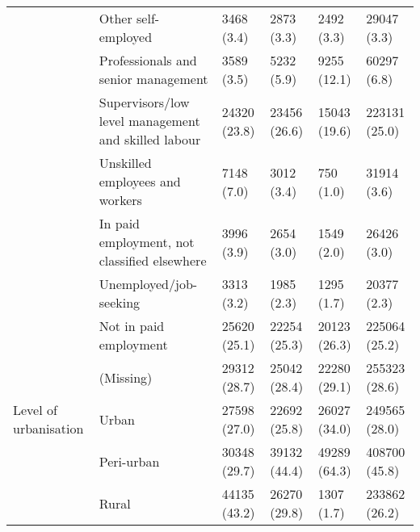 \begin{tabular}{llllll}
 & Other self-employed & 3468 (3.4) & 2873 (3.3) & 2492 (3.3) & 29047 (3.3)\\
 & Professionals and senior management & 3589 (3.5) & 5232 (5.9) & 9255 (12.1) & 60297 (6.8)\\
 & Supervisors/low level management and skilled labour & 24320 (23.8) & 23456 (26.6) & 15043 (19.6) & 223131 (25.0)\\
 & Unskilled employees and workers & 7148 (7.0) & 3012 (3.4) & 750 (1.0) & 31914 (3.6)\\
 & In paid employment, not classified elsewhere & 3996 (3.9) & 2654 (3.0) & 1549 (2.0) & 26426 (3.0)\\
 & Unemployed/job-seeking & 3313 (3.2) & 1985 (2.3) & 1295 (1.7) & 20377 (2.3)\\
 & Not in paid employment & 25620 (25.1) & 22254 (25.3) & 20123 (26.3) & 225064 (25.2)\\
 & (Missing) & 29312 (28.7) & 25042 (28.4) & 22280 (29.1) & 255323 (28.6)\\
\addlinespace
Level of urbanisation & Urban & 27598 (27.0) & 22692 (25.8) & 26027 (34.0) & 249565 (28.0)\\
 & Peri-urban & 30348 (29.7) & 39132 (44.4) & 49289 (64.3) & 408700 (45.8)\\
 & Rural & 44135 (43.2) & 26270 (29.8) & 1307 (1.7) & 233862 (26.2)\\
\bottomrule
\end{tabular}